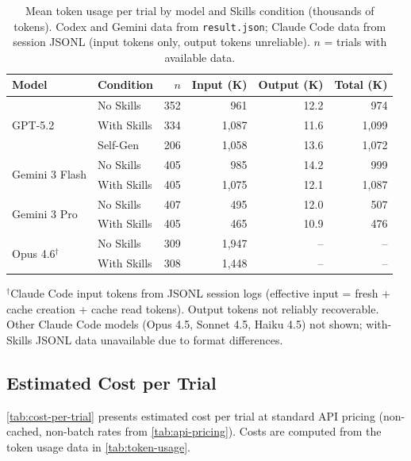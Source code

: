 \begin{table}[htb]
\centering
\small
\caption{Mean token usage per trial by model and Skills condition (thousands of tokens). Codex and Gemini data from \texttt{result.json}; Claude Code data from session JSONL (input tokens only, output tokens unreliable). $n$ = trials with available data.}
\label{tab:token-usage}
\setlength{\tabcolsep}{3pt}
\begin{tabular}{llrrrr}
\toprule
\textbf{Model} & \textbf{Condition} & \textbf{$n$} & \textbf{Input (K)} & \textbf{Output (K)} & \textbf{Total (K)} \\
\midrule
\multirow{3}{*}{GPT-5.2} & No Skills & 352 & 961 & 12.2 & 974 \\
& With Skills & 334 & 1,087 & 11.6 & 1,099 \\
& Self-Gen & 206 & 1,058 & 13.6 & 1,072 \\
\midrule
\multirow{2}{*}{Gemini 3 Flash} & No Skills & 405 & 985 & 14.2 & 999 \\
& With Skills & 405 & 1,075 & 12.1 & 1,087 \\
\midrule
\multirow{2}{*}{Gemini 3 Pro} & No Skills & 407 & 495 & 12.0 & 507 \\
& With Skills & 405 & 465 & 10.9 & 476 \\
\midrule
\multirow{2}{*}{Opus 4.6$^\dagger$} & No Skills & 309 & 1,947 & -- & -- \\
& With Skills & 308 & 1,448 & -- & -- \\
\bottomrule
\end{tabular}

\vspace{2pt}
\footnotesize $^\dagger$Claude Code input tokens from JSONL session logs (effective input = fresh + cache creation + cache read tokens). Output tokens not reliably recoverable. Other Claude Code models (Opus 4.5, Sonnet 4.5, Haiku 4.5) not shown; with-Skills JSONL data unavailable due to format differences.
\end{table}

\subsection{Estimated Cost per Trial}

\autoref{tab:cost-per-trial} presents estimated cost per trial at standard API pricing (non-cached, non-batch rates from \autoref{tab:api-pricing}). Costs are computed from the token usage data in \autoref{tab:token-usage}.

